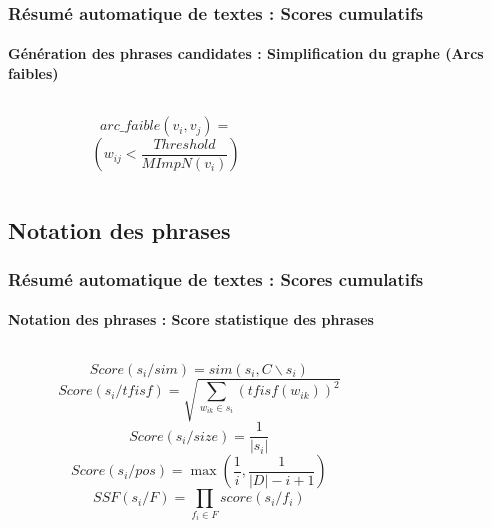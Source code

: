 \documentclass[xcolor=table]{beamer}
\begin{document}
\begin{frame}
\frametitle{Résumé automatique de textes : Scores cumulatifs}
\framesubtitle{Génération des phrases candidates : Simplification du graphe (Arcs faibles)}
	
\begin{columns}
	\begin{column}{0.45\textwidth}
		\[arc\_faible(v_i, v_j) = \]
		\[( w_{ij} < \frac{Threshold}{MImpN(v_i)})\]
	\end{column}
	\begin{column}{0.45\textwidth}
	\end{column}
\end{columns}
		
\end{frame}

\subsection{Notation des phrases} 

\begin{frame}
\frametitle{Résumé automatique de textes : Scores cumulatifs}
\framesubtitle{Notation des phrases : Score statistique des phrases}
	
\begin{columns}
	\begin{column}{0.45\textwidth}
		{\color{darkred}\[Score(s_i/ sim) = sim(s_i, C\backslash s_i)\]}
		{\color{darkgreen}\[Score(s_i/ tfisf) = \sqrt{\sum\limits_{w_{ik} \in s_i} (tfisf(w_{ik}))^2}\]}
		{\color{darkblue}\[Score(s_i/ size) = \frac{1}{|s_i|}\]}
		{\color{darkyellow}\[Score(s_i/ pos) = \max (\frac{1}{i}, \frac{1}{|D| - i + 1})\]}
		\[SSF(s_i/ F) = \prod_{f_i \in F} score(s_i/f_i)\]
		
	\end{column}
	\begin{column}{0.45\textwidth}
	\end{column}
\end{columns}

\end{frame}
\end{document}
